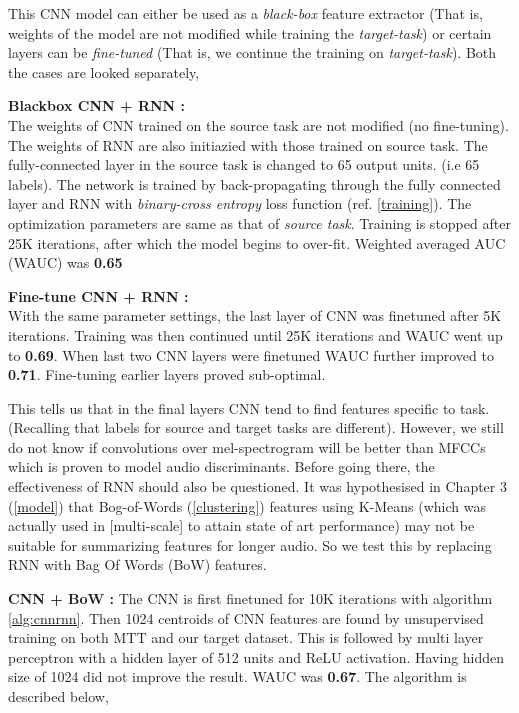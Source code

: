 \noindent This CNN model can either be used as a \textit{black-box} feature extractor (That is, weights of the model are not modified while training the \textit{target-task}) or certain layers can be \textit{fine-tuned} (That is, we continue the training on \textit{target-task}). Both the cases are looked separately,
\bigskip

\noindent \textbf{Blackbox CNN + RNN :}\\ 
The weights of CNN trained on the source task are not modified (no fine-tuning). The weights of RNN are also initiazied with those trained on source task. The fully-connected layer in the source task is changed to 65 output units. (i.e 65 labels). The network is trained by back-propagating through the fully connected layer and RNN with \textit{binary-cross entropy} loss function (ref. \ref{training}). The optimization parameters are same as that of \textit{source task}. Training is stopped after 25K iterations, after which the model begins to over-fit. Weighted averaged AUC (WAUC) was \textbf{0.65}
\bigskip

\noindent \textbf{Fine-tune CNN + RNN :}\\
With the same parameter settings, the last layer of CNN was finetuned after 5K iterations. Training was then continued until 25K iterations and WAUC went up to \textbf{0.69}. When last two CNN layers were finetuned WAUC further improved to \textbf{0.71}. Fine-tuning earlier layers proved sub-optimal. 
\bigskip

\noindent This tells us that in the final layers CNN tend to find features specific to task. (Recalling that labels for source and target tasks are different). However, we still do not know if convolutions over mel-spectrogram will be better than MFCCs which is proven to model audio discriminants. Before going there, the effectiveness of RNN should also be questioned. It was hypothesised in Chapter 3 (\ref{model}) that Bog-of-Words (\ref{clustering}) features using K-Means (which was actually used in [multi-scale] to attain state of art performance) may not be suitable for summarizing features for longer audio. So we test this by replacing RNN with Bag Of Words (BoW) features.
\bigskip

\noindent \textbf{CNN + BoW :}
The CNN is first finetuned for 10K iterations with algorithm \ref{alg:cnnrnn}. Then 1024 centroids of CNN features are found by unsupervised training on both MTT and our target dataset. This is followed by multi layer perceptron with a hidden layer of 512 units and ReLU activation. Having hidden size of 1024 did not improve the result. WAUC was \textbf{0.67}. The algorithm is described below,

